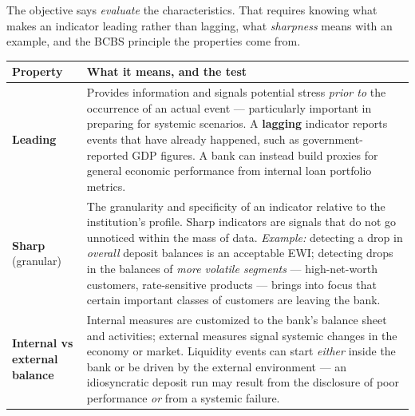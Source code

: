 \gapbadge
{}

\begin{lrgapbox}
The objective says \emph{evaluate} the characteristics. That requires knowing what makes an indicator leading rather than lagging, what \emph{sharpness} means with an example, and the BCBS principle the properties come from.
\end{lrgapbox}

\begin{center}
\small
\begin{tabularx}{\textwidth}{@{}p{2.6cm} X@{}}
\toprule
\rowcolor{FRMSoft}\textbf{Property} & \textbf{What it means, and the test} \\
\midrule
\textbf{Leading} & Provides information and signals potential stress \emph{prior to} the occurrence of an actual event — particularly important in preparing for systemic scenarios. A \textbf{lagging} indicator reports events that have already happened, such as government-reported GDP figures. A bank can instead build proxies for general economic performance from internal loan portfolio metrics. \\
\addlinespace
\textbf{Sharp} (granular) & The granularity and specificity of an indicator relative to the institution's profile. Sharp indicators are signals that do not go unnoticed within the mass of data. \textit{Example:} detecting a drop in \emph{overall} deposit balances is an acceptable EWI; detecting drops in the balances of \emph{more volatile segments} — high-net-worth customers, rate-sensitive products — brings into focus that certain important classes of customers are leaving the bank. \\
\addlinespace
\textbf{Internal vs external balance} & Internal measures are customized to the bank's balance sheet and activities; external measures signal systemic changes in the economy or market. Liquidity events can start \emph{either} inside the bank or be driven by the external environment — an idiosyncratic deposit run may result from the disclosure of poor performance \emph{or} from a systemic failure. \\
\bottomrule
\end{tabularx}
\end{center}

